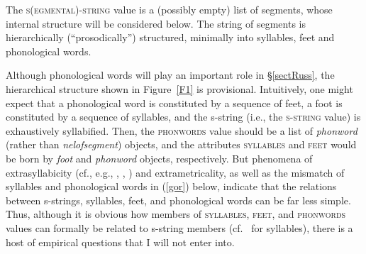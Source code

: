 \documentclass[output=paper]{langsci/langscibook}
\begin{document}
The \textsc{s(egmental)-string} value is a (possibly empty) list of segments,
whose internal structure will be considered below. The string of segments
is hierarchically (``prosodically'') structured, minimally into syllables,
feet and phonological words.

Although phonological words will play an important role
in \S\ref{sectRuss}, the hierarchical structure shown in Figure~\ref{F1} is
provisional. Intuitively, one might expect that a phonological word is
constituted by a sequence of feet, a foot is constituted by a sequence of
syllables, and the s-string (i.e., the \textsc{s-string} value) is
exhaustively syllabified.  Then, the \textsc{phonwords} value should be a list
of \textit{phonword} (rather than \textit{nelofsegment}) objects, and the
attributes \textsc{syllables} and \textsc{feet} would be born by \textit{foot} and
\textit{phonword}\/ objects, respectively.  But phenomena of extrasyllabicity
(cf., e.g., \citealt{bage:91},
\citealt{guss:92}, \citealt{hyma:92}) and
extrametricality, as well as the mismatch of syllables and phonological
words in (\ref{gor}) below, indicate that the relations between s-strings,
syllables, feet, and phonological words can be 
far less simple.
Thus, although it is obvious how members of \textsc{syllables}, \textsc{feet},
and \textsc{phonwords} values can formally be related to s-string members
(cf.\ \citealt{mast:93} for syllables), there is a
host of empirical questions that I will not enter into.%
\end{document}
